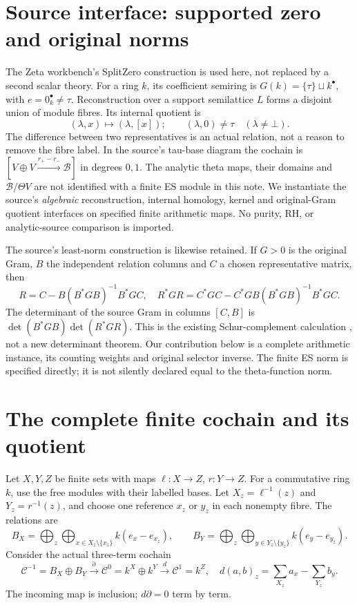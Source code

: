 \section{Source interface: supported zero and original norms}
The Zeta workbench's SplitZero construction \cite{Derived,Tau,Toda} is
used here, not replaced by a second scalar theory. For a ring $k$, its
coefficient semiring is $G(k)=\{\tau\}\sqcup k^\bullet$, with
$e=0_k^\bullet\ne\tau$. Reconstruction over a support semilattice $L$
forms a disjoint union of module fibres. Its internal quotient is
\[
 (\lambda,x)\longmapsto(\lambda,[x]);
 \qquad (\lambda,0)\ne\tau\quad(\lambda\ne\bot).
\]
The difference between two representatives is an actual relation, not a
reason to remove the fibre label. In the source's tau-base diagram the
cochain is $[V\oplus V\xrightarrow{r_+-r_-}\mathscr B]$ in degrees $0,1$.
The analytic theta maps, their domains and $\mathscr B/\Theta V$ are not
identified with a finite ES module in this note. We instantiate the
source's \emph{algebraic} reconstruction, internal homology, kernel and
original-Gram quotient interfaces on specified finite arithmetic maps.
No purity, RH, or analytic-source comparison is imported.

The source's least-norm construction is likewise retained. If $G>0$ is
the original Gram, $B$ the independent relation columns and $C$ a chosen
representative matrix, then
\[
 R=C-B(B^*GB)^{-1}B^*GC,\quad
 R^*GR=C^*GC-C^*GB(B^*GB)^{-1}B^*GC.                 \tag{1}
\]
The determinant of the source Gram in columns $[C,B]$ is
$\det(B^*GB)\det(R^*GR)$. This is the existing Schur-complement calculation
\cite[\S1]{Toda}, not a new determinant theorem. Our contribution below
is a complete arithmetic instance, its counting weights and original
selector inverse. The finite ES norm is specified directly; it is not
silently declared equal to the theta-function norm.

\section{The complete finite cochain and its quotient}
Let $X,Y,Z$ be finite sets with maps $\ell:X\to Z$, $r:Y\to Z$.
For a commutative ring $k$, use the free modules with their labelled bases.
Let $X_z=\ell^{-1}(z)$ and $Y_z=r^{-1}(z)$, and choose one reference
$x_z$ or $y_z$ in each nonempty fibre. The relations are
\[
 B_X=\bigoplus_{z}\bigoplus_{x\in X_z\setminus\{x_z\}}k(e_x-e_{x_z}),
 \qquad B_Y=\bigoplus_{z}\bigoplus_{y\in Y_z\setminus\{y_z\}}k(e_y-e_{y_z}).
\]
Consider the actual three-term cochain
\[
 \mathcal C^{-1}=B_X\oplus B_Y
 \xrightarrow{\partial}\mathcal C^0=k^X\oplus k^Y
 \xrightarrow{d}\mathcal C^1=k^Z,
 \quad d(a,b)_z=\sum_{X_z}a_x-\sum_{Y_z}b_y.       \tag{2}
\]
The incoming map is inclusion; $d\partial=0$ term by term.

